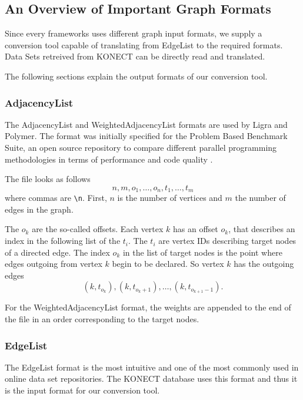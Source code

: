 
\subsection{An Overview of Important Graph Formats}
Since every frameworks uses different graph input formats, we supply a conversion tool capable of translating from EdgeList to the required formats.
Data Sets retreived from KONECT can be directly read and translated.

The following sections explain the output formats of our conversion tool.
\subsubsection{AdjacencyList}
The AdjacencyList and WeightedAdjacencyList formats are used by Ligra and Polymer. The format was initially specified for the Problem Based Benchmark Suite, an open source repository to compare different parallel programming methodologies in terms of performance and code quality \cite{pbbs}.

The file looks as follows
\begin{equation*}
	n, m, o_1, \ldots, o_n, t_1, \ldots, t_m
\end{equation*}
where commas are \texttt{\textbackslash n}. First, $n$ is the number of vertices and $m$ the number of edges in the graph.

The $o_k$ are the so-called offsets. Each vertex $k$ has an offset $o_k$, that describes an index in the following list of the $t_i$.
The $t_i$ are vertex IDs describing target nodes of a directed edge. 
The index $o_k$ in the list of target nodes is the point where edges outgoing from vertex $k$ begin to be declared. So vertex $k$ has the outgoing edges
\begin{equation*}
	(k, t_{o_k}), (k, t_{o_k+1}),\ldots, (k, t_{o_{k+1}-1}).
\end{equation*}

For the WeightedAdjacencyList format, the weights are appended to the end of the file in an order corresponding to the target nodes.

\subsubsection{EdgeList}
The EdgeList format is the most intuitive and one of the most commonly used in online data set repositories. The KONECT database uses this format and thus it is the input format for our conversion tool.

